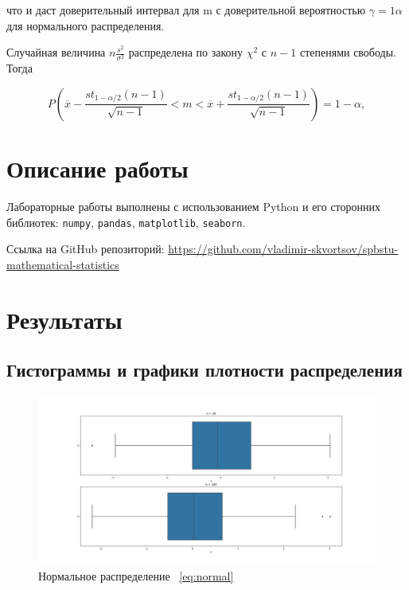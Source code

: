 \documentclass[12pt,a4paper]{article}
\begin{document}
	что и даст доверительный интервал для m с доверительной вероятностью $\gamma = 1 \alpha$ для нормального распределения.

	Случайная величина $n \frac{s^2}{\sigma^2}$ распределена по закону $\chi^2$ с $n - 1$ степенями свободы. Тогда

	\begin{equation} \label{eq:mean_boundaries}
		P \left ( \overline x - \frac{st_{1 - \alpha / 2}(n - 1)}{\sqrt{n - 1}} < m < \overline x + \frac{st_{1 - \alpha / 2}(n - 1)}{\sqrt{n - 1}} \right ) = 1 - \alpha,
	\end{equation}

	\section{Описание работы}

	Лабораторные работы выполнены с использованием Python и его сторонних библиотек: \verb!numpy!, \verb!pandas!, \verb!matplotlib!, \verb!seaborn!.

	Ссылка на GitHub репозиторий: \href{https://github.com/vladimir-skvortsov/spbstu-mathematical-statistics}{https://github.com/vladimir-skvortsov/spbstu-mathematical-statistics}

	\newpage

	\section{Результаты}

	\subsection{Гистограммы и графики плотности распределения}

	\begin{figure}[htbp!]
		\begin{center}
			\includegraphics[width = 1.12\linewidth]{graphics/normal.png}
			\caption{Нормальное распределение \ \eqref{eq:normal}}
		\end{center}
	\end{figure}
\end{document}
